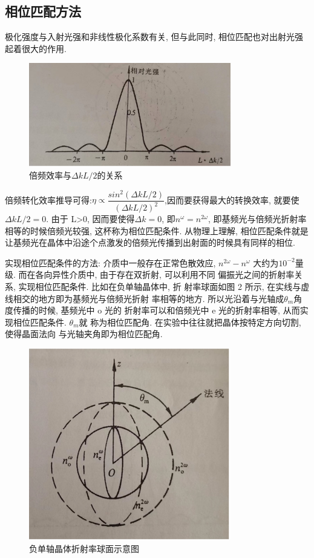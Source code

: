 \documentclass[aps,pre,12pt,preprint,%
	onecolumn,showpacs,showkeys,nofootinbib]{revtex4-2}
\begin{document}
\subsection{相位匹配方法}
极化强度与入射光强和非线性极化系数有关, 但与此同时, 相位匹配也对出射光强起着很大的作用.
	\begin{figure}[!h]
	\centering
	\includegraphics[width=.9\linewidth]{img/1.png}
	\caption[倍频效率与$\Delta kL/2 $的关系]{倍频效率与$\Delta kL/2 $的关系}\vspace{1ex}
	\end{figure}
    \par 倍频转化效率推导可得:$\eta\propto \dfrac{sin^2(\Delta kL/2)}{(\Delta kL/2)^2}$,因而要获得最大的转换效率, 就要使$\Delta kL/2=0$. 由于 L>0, 因而要使得$\Delta k=0$, 即$n^\omega=n^{2\omega}$, 即基频光与倍频光折射率相等的时候倍频光较强, 这杯称为相位匹配条件. 从物理上理解, 相位匹配条件就是让基频光在晶体中沿途个点激发的倍频光传播到出射面的时候具有同样的相位.
    \par 实现相位匹配条件的方法: 介质中一般存在正常色散效应, $n^{2\omega}-n^\omega$
    大约为$10^{-2}$量级. 而在各向异性介质中, 由于存在双折射, 可以利用不同
    偏振光之间的折射率关系, 实现相位匹配条件. 比如在负单轴晶体中, 折
    射率球面如图 2 所示, 在实线与虚线相交的地方即为基频光与倍频光折射
    率相等的地方. 所以光沿着与光轴成$\theta_m$角度传播的时候, 基频光中 o 光的
    折射率可以和倍频光中 e 光的折射率相等, 从而实现相位匹配条件. $\theta_m$就
    称为相位匹配角. 在实验中往往就把晶体按特定方向切割, 使得晶面法向
    与光轴夹角即为相位匹配角.
    	\begin{figure}[!h]
    	\centering
    	\includegraphics[width=.7\linewidth]{img/2.png}
    	\caption[负单轴晶体折射率球面示意图]{负单轴晶体折射率球面示意图}\vspace{1ex}
        \end{figure}
\end{document}
